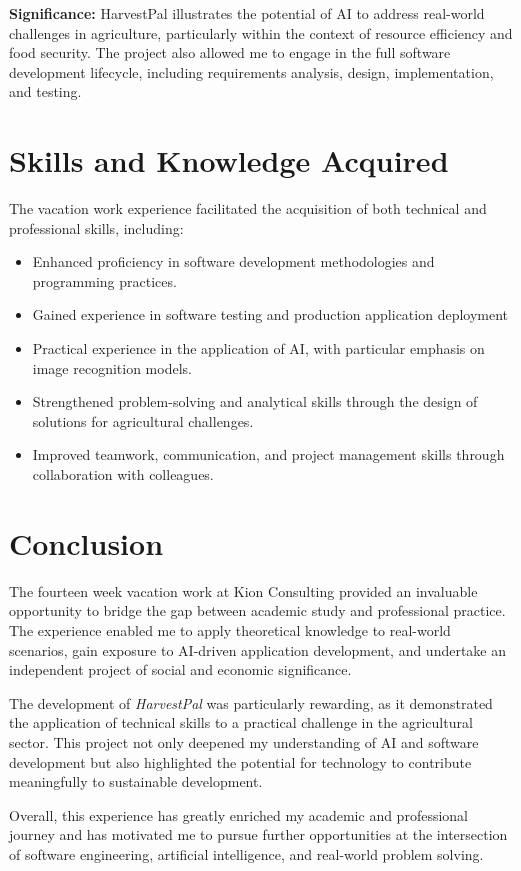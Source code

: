 \documentclass[12pt,a4paper]{report}
\begin{document}
	\textbf{Significance:} HarvestPal illustrates the potential of AI to address real-world challenges in agriculture, particularly within the context of resource efficiency and food security. The project also allowed me to engage in the full software development lifecycle, including requirements analysis, design, implementation, and testing.
	
	\section*{Skills and Knowledge Acquired}
	The vacation work experience facilitated the acquisition of both technical and professional skills, including:
	\begin{itemize}
		\item Enhanced proficiency in software development methodologies and programming practices.
		\item Gained experience in software testing and production application deployment
		\item Practical experience in the application of AI, with particular emphasis on image recognition models.
		\item Strengthened problem-solving and analytical skills through the design of solutions for agricultural challenges.
		\item Improved teamwork, communication, and project management skills through collaboration with colleagues.
	\end{itemize}
	
	\section*{Conclusion}
	The fourteen week vacation work at Kion Consulting provided an invaluable opportunity to bridge the gap between academic study and professional practice. The experience enabled me to apply theoretical knowledge to real-world scenarios, gain exposure to AI-driven application development, and undertake an independent project of social and economic significance.
	
	The development of \textit{HarvestPal} was particularly rewarding, as it demonstrated the application of technical skills to a practical challenge in the agricultural sector. This project not only deepened my understanding of AI and software development but also highlighted the potential for technology to contribute meaningfully to sustainable development.
	
	Overall, this experience has greatly enriched my academic and professional journey and has motivated me to pursue further opportunities at the intersection of software engineering, artificial intelligence, and real-world problem solving.
	
\end{document}
